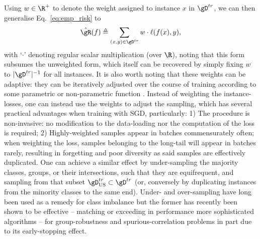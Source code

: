 Using \( w \in \R^+ \) to denote the weight assigned to instance \(x\) in \( \gD^{tr} \), we can
then generalise Eq.~\ref{eq:emp_risk} to
\begin{equation*} \label{eq:emp_risk_weighted} \hat{\gR}(f) \triangleq \sum_{(x, y) \in \gD^{tr}} w
\cdot \ell (f(x), y), \end{equation*}
with `\( \cdot \)' denoting regular scalar multiplication (over \(\R\)), noting that this form
subsumes the unweighted form, which itself can be recovered by simply fixing \(w\) to \(
|\gD^{tr}|^{-1} \) for all instances.
%
It is also worth noting that these weights can be adaptive: they can be iteratively adjusted over
the course of training according to some parametric or non-parametric function
\citep{wang2021importance}.
%
Instead of weighting the instance-losses, one can instead use the weights to adjust the sampling,
which has several practical advantages when training with \ac{SGD}, particularly: 
1) The procedure is non-invasive: no modification to the data-loading nor the computation of the
loss is required;
%
2) Highly-weighted samples appear in batches commensurately often; when weighting the loss, samples
belonging to the long-tail will appear in batches rarely, resulting in forgetting and poor
diversity as said samples are effectively duplicated.
One can achieve a similar effect by under-sampling the majority classes, groups, or their
intersections, such that they are equifrequent, and \iid{} sampling from that subset \(
\gD^{tr}_{\text{US}} \subset \gD^{tr} \) (or, conversely by duplicating instances from the minority
classes to the same end).
Under- and over-sampling have long been used as a remedy for class imbalance
\citep{chawla2002smote} but the former has recently been shown to be effective -- matching or
exceeding in performance more sophisticated algorithms -- for group-robustness and
spurious-correlation problems \citep{sagawa2020investigation, idrissi2022simple} in part due to its
early-stopping effect.

